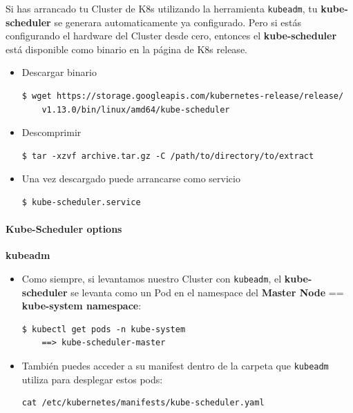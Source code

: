 \documentclass{article}
\newenvironment{codetemplate}[1][]{%
  \mybasecolorbox[#1]
  \itshape
}{%
  \endmybasecolorbox
}
\begin{document}
Si has arrancado tu Cluster de K8s utilizando la herramienta \verb|kubeadm|, tu \textbf{kube-scheduler} se generara automaticamente ya configurado. Pero si estás configurando el hardware del Cluster desde cero, entonces el \textbf{kube-scheduler} está disponible como binario en la página de K8s release.

\begin{itemize}
    \item Descargar binario
\begin{codetemplate}{}
\begin{verbatim}
$ wget https://storage.googleapis.com/kubernetes-release/release/
    v1.13.0/bin/linux/amd64/kube-scheduler
\end{verbatim}
\end{codetemplate}

    \item Descomprimir
\begin{codetemplate}{}
\begin{verbatim}
$ tar -xzvf archive.tar.gz -C /path/to/directory/to/extract
\end{verbatim}
\end{codetemplate} 

    \item Una vez descargado puede arrancarse como servicio
\begin{codetemplate}{}
\begin{verbatim}
$ kube-scheduler.service
\end{verbatim}
\end{codetemplate}
\end{itemize}

\paragraph{Kube-Scheduler options}

\textbf{kubeadm}

\begin{itemize}
    \item Como siempre, si levantamos nuestro Cluster con \verb|kubeadm|, el \textbf{kube-scheduler} se levanta como un Pod en el namespace del \textbf{Master Node} == \textbf{kube-system namespace}:
\begin{codetemplate}{}
\begin{verbatim}
$ kubectl get pods -n kube-system
    ==> kube-scheduler-master
\end{verbatim}
\end{codetemplate}

    \item También puedes acceder a su manifest dentro de la carpeta que \verb|kubeadm| utiliza para desplegar estos pods:
\begin{codetemplate}{}
\begin{verbatim}
cat /etc/kubernetes/manifests/kube-scheduler.yaml
\end{verbatim}
\end{codetemplate}
\end{itemize}
\end{document}
